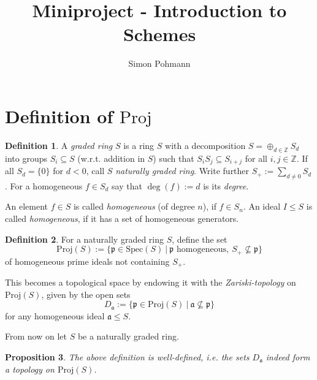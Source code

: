 \documentclass{scrartcl}
\title{Miniproject - Introduction to Schemes}
\author{Simon Pohmann}
\newcommand{\Z}{\mathbb{Z}}
\newcommand{\p}{\mathfrak{p}}
\renewcommand{\a}{\mathfrak{a}}
\newcommand{\Spec}{\mathrm{Spec}}
\newcommand{\Proj}{\mathrm{Proj}}
\newtheorem{prop}{Proposition}
\theoremstyle{definition}
\newtheorem{definition}[prop]{Definition}
\begin{document}
\maketitle

\tableofcontents

\section{Definition of $\Proj$}

\begin{definition}
    A \emph{graded ring} $S$ is a ring $S$ with a decomposition $S = \oplus_{d \in \Z} S_d$ into groups $S_i \subseteq S$ (w.r.t. addition in $S$) such that $S_i S_j \subseteq S_{i + j}$ for all $i, j \in \Z$.
    If all $S_d = \{ 0 \}$ for $d < 0$, call $S$ \emph{naturally graded ring}.
    Write further $S_+ := \sum_{d \neq 0} S_d$.
    For a homogeneous $f \in S_d$ say that $\deg(f) := d$ is its \emph{degree}.

    An element $f \in S$ is called \emph{homogeneous} (of degree $n$), if $f \in S_n$.
    An ideal $I \leq S$ is called \emph{homogeneous}, if it has a set of homogeneous generators.
\end{definition}
\begin{definition}
    For a naturally graded ring $S$, define the set
    \begin{equation*}
        \Proj(S) := \{ \p \in \Spec(S) \ | \ \text{$\p$ homogeneous}, \ S_+ \not\subseteq \p \}
    \end{equation*}
    of homogeneous prime ideals not containing $S_+$.

    This becomes a topological space by endowing it with the \emph{Zariski-topology} on $\Proj(S)$, given by the open sets
    \begin{equation*}
        D_{\a} := \{ \p \in \Proj(S) \ | \ \a \not\subseteq \p \}
    \end{equation*}
    for any homogeneous ideal $\a \leq S$.
\end{definition}
From now on let $S$ be a naturally graded ring.
\begin{prop}
    The above definition is well-defined, i.e. the sets $D_\a$ indeed form a topology on $\Proj(S)$.
\end{prop}
\end{document}

